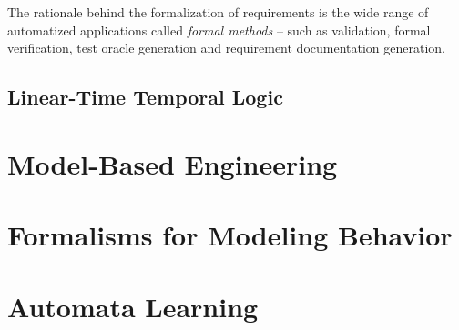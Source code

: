 The rationale behind the formalization of requirements is the wide range of automatized applications called \textit{formal methods} -- such as validation, formal verification, test oracle generation and requirement documentation generation.

\subsection{Linear-Time Temporal Logic} \label{subs_backgrltl}



\section{Model-Based Engineering} \label{sec_backgrmbe}

\section{Formalisms for Modeling Behavior} \label{sec_backgrmodeling}






\section{Automata Learning} \label{sec_backgrautomatalearning}


